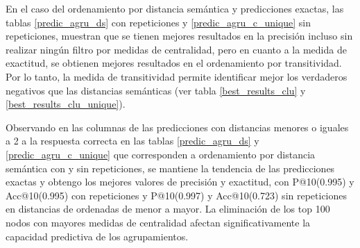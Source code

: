En el caso del ordenamiento por distancia semántica y predicciones exactas, las tablas \ref{predic_agru_ds} con repeticiones y \ref{predic_agru_c_unique} sin repeticiones, muestran que se tienen mejores resultados en la precisión incluso sin realizar ningún filtro por medidas de centralidad, pero en cuanto a la medida de exactitud, se obtienen mejores resultados en el ordenamiento por transitividad. Por lo tanto, la medida de transitividad permite identificar mejor los verdaderos negativos que las distancias semánticas (ver tabla \ref{best_results_clu} y \ref{best_results_clu_unique}). 

Observando en las columnas de las predicciones con distancias menores o iguales a 2 a la respuesta correcta en las tablas \ref{predic_agru_ds} y \ref{predic_agru_c_unique} que corresponden a ordenamiento por distancia semántica con y sin repeticiones, se mantiene la tendencia de las predicciones exactas y obtengo los mejores valores de precisión y exactitud, con P@10(\num{0,995}) y Acc@10(\num{0,995}) con repeticiones y P@10(\num{0,997}) y Acc@10(\num{0,723}) sin repeticiones en distancias de ordenadas de menor a mayor. La eliminación de los top 100 nodos con mayores medidas de centralidad afectan significativamente la capacidad predictiva de los agrupamientos. 


